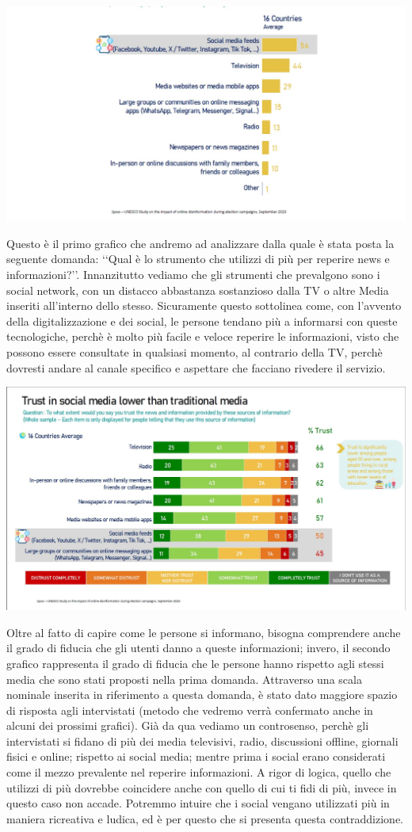 \documentclass{article}
\begin{document}
\centering\includegraphics[width=0.6\linewidth]{Immagini/Grafico1.jpg}\\
    \begin{justify}
    Questo è il primo grafico che andremo ad analizzare dalla quale è stata posta la seguente domanda: ‘‘Qual è lo strumento che utilizzi di più per reperire news e informazioni?’’.
    Innanzitutto vediamo che gli strumenti che prevalgono sono i social network, con un distacco abbastanza sostanzioso dalla TV o altre Media inseriti all'interno dello stesso. Sicuramente questo sottolinea come, con l'avvento della digitalizzazione e dei social, le persone tendano più a informarsi con queste tecnologiche, perchè è molto più facile e veloce reperire le informazioni, visto che possono essere consultate in qualsiasi momento, al contrario della TV, perchè dovresti andare al canale specifico e aspettare che facciano rivedere il servizio.
    
\begin{center}
\includegraphics[width=0.6\linewidth]{Immagini/Grafico2.jpg}\\
\end{center}
    Oltre al fatto di capire come le persone si informano, bisogna comprendere anche il grado di fiducia che gli utenti danno a queste informazioni; invero, il secondo grafico rappresenta il grado di fiducia che le persone hanno rispetto agli stessi media che sono stati proposti nella prima domanda.
    Attraverso una scala nominale inserita in riferimento a questa domanda, è stato dato maggiore spazio di risposta agli intervistati (metodo che vedremo verrà confermato anche in alcuni dei prossimi grafici).
    Già da qua vediamo un controsenso, perchè gli intervistati si fidano di più dei media televisivi, radio, discussioni offline, giornali fisici e online; rispetto ai social media; mentre prima i social erano considerati come il mezzo prevalente nel reperire informazioni. A rigor di logica, quello che utilizzi di più dovrebbe coincidere anche con quello di cui ti fidi di più, invece in questo caso non accade. Potremmo intuire che i social vengano utilizzati più in maniera ricreativa e ludica, ed è per questo che si presenta questa contraddizione.
    

\end{justify}
\end{document}
